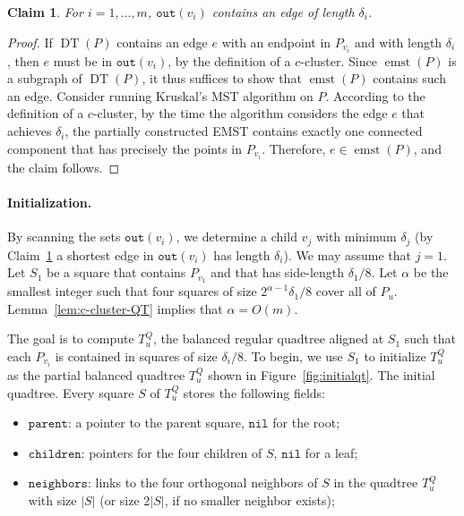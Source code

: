\documentclass[11pt]{paper}
\DeclareMathOperator {\emst}{emst}
\DeclareMathOperator {\DT}{DT}
\newtheorem {claim}[theorem] {Claim}
\begin{document}
\begin{claim}\label{clm:delta_i}
For $i = 1, \ldots, m$, \emph{$\texttt{out}(v_i)$} contains an edge of
length $\delta_i$.
\end{claim}

\begin{proof}
If $\DT(P)$ contains an edge $e$ with an endpoint in $P_{v_i}$ and
with length $\delta_i$, then $e$ must
be in $\texttt{out}(v_i)$, by the definition of a $c$-cluster.
Since $\emst(P)$ is a subgraph of $\DT(P)$, it thus suffices to show that
$\emst(P)$ contains such an edge.
Consider running Kruskal's MST algorithm on $P$. According to the
definition of a $c$-cluster, by the time the algorithm considers the edge $e$
that achieves $\delta_i$, the partially constructed EMST contains exactly
one connected component that has precisely the points in $P_{v_i}$.
Therefore, $e \in \emst(P)$, and the claim follows.
\end{proof}

\paragraph{Initialization.}
By scanning the sets $\texttt{out}(v_i)$, we determine a child $v_j$
with minimum $\delta_j$ (by Claim~\ref{clm:delta_i} a shortest edge in
$\texttt{out}(v_i)$ has length $\delta_i$).
We may assume that $j = 1$. Let $S_1$ be a square that contains
$P_{v_1}$ and that has side-length $\delta_1 / 8$. Let $\alpha$ be
the smallest integer such
that four squares of size $2^{\alpha-1}\delta_1/8$ cover all of $P_u$.
Lemma~\ref {lem:c-cluster-QT} implies that $\alpha = O(m)$.

The goal is to compute $T_u^Q$, the balanced regular quadtree aligned at 
$S_1$ such that each $P_{v_i}$ is contained in squares of size $\delta_i/8$.
To begin, we use $S_1$ to initialize $T_u^Q$ as the partial 
balanced quadtree $T_u^Q$ shown in Figure~\ref{fig:initialqt}.
 {The initial quadtree.}
Every square $S$ of $T_u^Q$ stores the following fields:
\begin{itemize}
\item $\texttt{parent}$: a pointer to the parent square, $\texttt{nil}$ for
       the root;
\item $\texttt{children}$: pointers for the four children of $S$,
     $\texttt{nil}$ for a leaf;
\item $\texttt{neighbors}$: links to the four orthogonal neighbors of $S$
      in the quadtree $T_u^Q$ with size $|S|$
      (or size $2|S|$, if no smaller neighbor exists);
\end{itemize}
\end{document}
